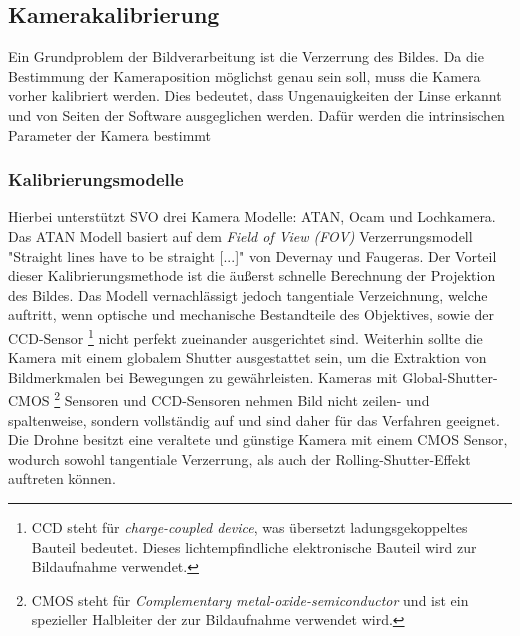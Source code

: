 \subsection{Kamerakalibrierung}
Ein Grundproblem der Bildverarbeitung ist die Verzerrung des Bildes. 
Da die Bestimmung der Kameraposition möglichst genau sein soll, muss die Kamera vorher kalibriert werden. Dies bedeutet, dass Ungenauigkeiten der Linse erkannt und von Seiten der Software ausgeglichen werden. Dafür werden die intrinsischen Parameter der Kamera bestimmt \newline

\subsubsection*{Kalibrierungsmodelle}
Hierbei unterstützt SVO drei Kamera Modelle: ATAN, Ocam und Lochkamera. \cite{svo_cameracalibration} \newline
Das ATAN Modell basiert auf dem \textit{Field of View \emph{(FOV)}} Verzerrungsmodell "Straight lines have to be straight [...]" von Devernay und Faugeras. \cite{calibration}\newline %
Der Vorteil dieser Kalibrierungsmethode ist die äußerst schnelle Berechnung der Projektion des Bildes.\cite{calibration2} %
Das Modell vernachlässigt jedoch tangentiale Verzeichnung, welche auftritt, wenn optische und mechanische Bestandteile des Objektives, sowie der CCD-Sensor 
\footnote{CCD steht für \emph{charge-coupled device}, was übersetzt ladungsgekoppeltes Bauteil bedeutet. Dieses lichtempfindliche elektronische Bauteil wird zur Bildaufnahme verwendet.} 
nicht perfekt zueinander ausgerichtet sind.\cite{calibration3} %
Weiterhin sollte die Kamera mit einem globalem Shutter ausgestattet sein, um die Extraktion von Bildmerkmalen bei Bewegungen zu gewährleisten. Kameras mit Global-Shutter-CMOS  
\footnote{CMOS steht für \emph{Complementary metal-oxide-semiconductor} und ist ein spezieller Halbleiter der zur Bildaufnahme verwendet wird.\cite{CMOS}} %
Sensoren und CCD-Sensoren nehmen Bild nicht zeilen- und spaltenweise, sondern vollständig auf und sind daher für das Verfahren geeignet. \newline
Die Drohne besitzt eine veraltete und günstige Kamera mit einem CMOS Sensor, wodurch sowohl tangentiale Verzerrung, als auch der Rolling-Shutter-Effekt auftreten können.\cite{developerGuide} \newline
